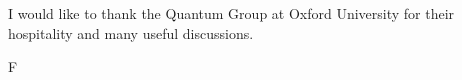 I would like to thank the Quantum Group at Oxford University for their
hospitality and many useful discussions.

F
